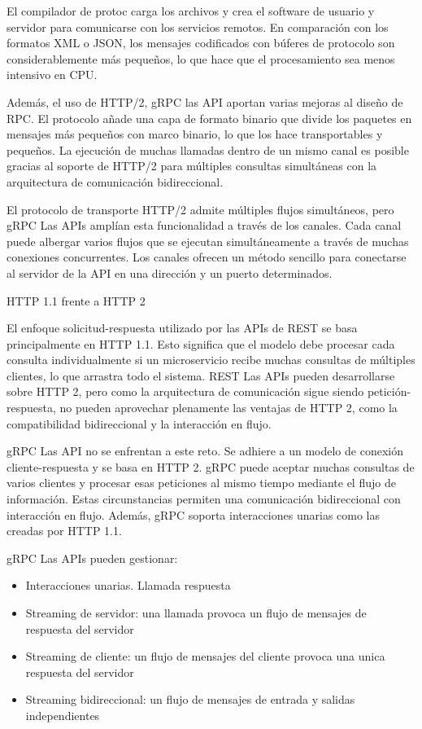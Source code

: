 El compilador de protoc carga los archivos y crea el software de usuario y servidor para comunicarse con los servicios remotos. En comparación con los formatos XML o JSON, los mensajes codificados con búferes de protocolo son considerablemente más pequeños, lo que hace que el procesamiento sea menos intensivo en CPU.

Además, el uso de HTTP/2, gRPC las API aportan varias mejoras al diseño de RPC. El protocolo añade una capa de formato binario que divide los paquetes en mensajes más pequeños con marco binario, lo que los hace transportables y pequeños. La ejecución de muchas llamadas dentro de un mismo canal es posible gracias al soporte de HTTP/2 para múltiples consultas simultáneas con la arquitectura de comunicación bidireccional.

El protocolo de transporte HTTP/2 admite múltiples flujos simultáneos, pero gRPC Las APIs amplían esta funcionalidad a través de los canales. Cada canal puede albergar varios flujos que se ejecutan simultáneamente a través de muchas conexiones concurrentes. Los canales ofrecen un método sencillo para conectarse al servidor de la API en una dirección y un puerto determinados.

HTTP 1.1 frente a HTTP 2

El enfoque solicitud-respuesta utilizado por las APIs de REST se basa principalmente en HTTP 1.1. Esto significa que el modelo debe procesar cada consulta individualmente si un microservicio recibe muchas consultas de múltiples clientes, lo que arrastra todo el sistema. REST Las APIs pueden desarrollarse sobre HTTP 2, pero como la arquitectura de comunicación sigue siendo petición-respuesta, no pueden aprovechar plenamente las ventajas de HTTP 2, como la compatibilidad bidireccional y la interacción en flujo.

gRPC Las API no se enfrentan a este reto. Se adhiere a un modelo de conexión cliente-respuesta y se basa en HTTP 2. gRPC puede aceptar muchas consultas de varios clientes y procesar esas peticiones al mismo tiempo mediante el flujo de información. Estas circunstancias permiten una comunicación bidireccional con interacción en flujo. Además, gRPC soporta interacciones unarias como las creadas por HTTP 1.1.

gRPC Las APIs pueden gestionar:

\begin{itemize}
    \item Interacciones unarias. Llamada respuesta
    \item Streaming de servidor: una llamada provoca un flujo de mensajes de respuesta del servidor
    \item Streaming de cliente: un flujo de mensajes del cliente provoca una unica respuesta del servidor
    \item Streaming bidireccional: un flujo de mensajes de entrada y salidas independientes
\end{itemize}


